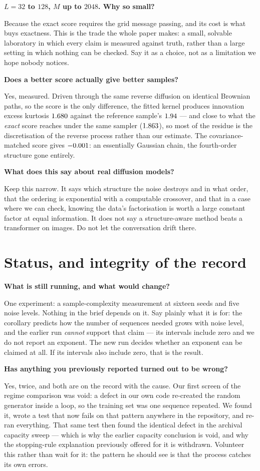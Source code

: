 \documentclass[10pt,a4paper]{article}
\newcommand{\nseq}{M}
\newcommand{\nsites}{L}
\newcommand{\Q}[1]{\par\medskip\noindent\textbf{#1}\par\nopagebreak\vspace{0.15em}\nopagebreak}
\begin{document}
\Q{$\nsites=32$ to $128$, $\nseq$ up to $2048$. Why so small?}
Because the exact score requires the grid message passing, and its cost is what buys exactness.
This is the trade the whole paper makes: a small, solvable laboratory in which every claim is
measured against truth, rather than a large setting in which nothing can be checked. Say it as a
choice, not as a limitation we hope nobody notices.

\Q{Does a better score actually give better samples?}
Yes, measured. Driven through the same reverse diffusion on identical Brownian paths, so the score
is the only difference, the fitted kernel produces innovation excess kurtosis $1.680$
against the reference sample's $1.94$ --- and close to what the \emph{exact} score reaches
under the same sampler ($1.863$), so most of the residue is the discretisation of the
reverse process rather than our estimate. The covariance-matched score gives $-0.001$:
an essentially Gaussian chain, the fourth-order structure gone entirely.

\Q{What does this say about real diffusion models?}
Keep this narrow. It says which structure the noise destroys and in what order, that the ordering
is exponential with a computable crossover, and that in a case where we can check, knowing the
data's factorisation is worth a large constant factor at equal information. It does not say a
structure-aware method beats a transformer on images. Do not let the conversation drift there.

\section*{Status, and integrity of the record}

\Q{What is still running, and what would change?}
One experiment: a sample-complexity measurement at sixteen seeds and five noise levels. Nothing in
the brief depends on it. Say plainly what it is for: the corollary predicts how the number of
sequences needed grows with noise level, and the earlier run \emph{cannot} support that claim ---
its intervals include zero and we do not report an exponent. The new run decides whether an
exponent can be claimed at all. If its intervals also include zero, that is the result.

\Q{Has anything you previously reported turned out to be wrong?}
Yes, twice, and both are on the record with the cause. Our first screen of the regime comparison
was void: a defect in our own code re-created the random generator inside a loop, so the training
set was one sequence repeated. We found it, wrote a test that now fails on that pattern anywhere in
the repository, and re-ran everything. That same test then found the identical defect in the
archival capacity sweep --- which is why the earlier capacity conclusion is void, and why the
stopping-rule explanation previously offered for it is withdrawn. Volunteer this rather than wait
for it: the pattern he should see is that the process catches its own errors.
\end{document}
